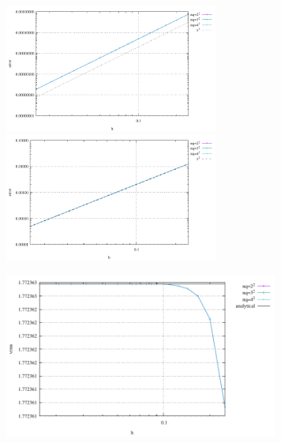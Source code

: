 \begin{center}
\includegraphics[width=7cm]{python_codes/fieldstone_76/results/mms2/errors_v}
\includegraphics[width=7cm]{python_codes/fieldstone_76/results/mms2/errors_p}
\end{center}

\begin{center}
\includegraphics[width=9cm]{python_codes/fieldstone_76/results/mms2/vrms}
\end{center}



